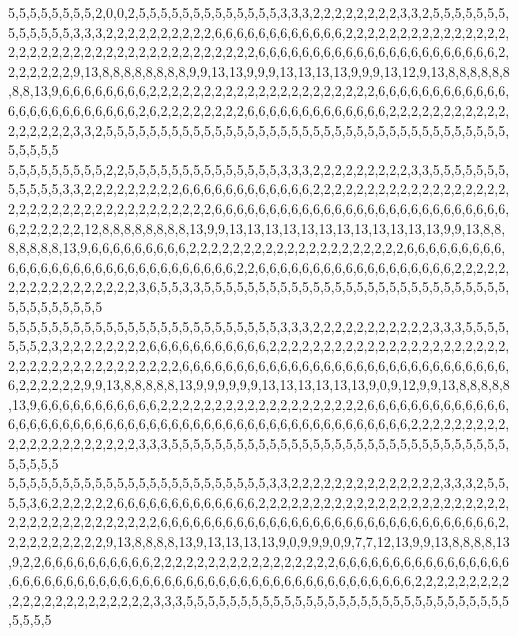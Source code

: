 5,5,5,5,5,5,5,5,2,0,0,2,5,5,5,5,5,5,5,5,5,5,5,5,5,3,3,3,2,2,2,2,2,2,2,2,3,3,2,5,5,5,5,5,5,5,5,5,5,5,5,5,3,3,3,2,2,2,2,2,2,2,2,2,2,6,6,6,6,6,6,6,6,6,6,6,6,2,2,2,2,2,2,2,2,2,2,2,2,2,2,2,2,2,2,2,2,2,2,2,2,2,2,2,2,2,2,2,2,2,2,2,2,2,2,6,6,6,6,6,6,6,6,6,6,6,6,6,6,6,6,6,6,6,6,6,6,2,2,2,2,2,2,2,9,13,8,8,8,8,8,8,8,8,9,9,13,13,9,9,9,13,13,13,13,9,9,9,13,12,9,13,8,8,8,8,8,8,8,8,13,9,6,6,6,6,6,6,6,6,2,2,2,2,2,2,2,2,2,2,2,2,2,2,2,2,2,2,2,2,2,6,6,6,6,6,6,6,6,6,6,6,6,6,6,6,6,6,6,6,6,6,6,6,6,2,6,2,2,2,2,2,2,2,2,6,6,6,6,6,6,6,6,6,6,6,6,6,2,2,2,2,2,2,2,2,2,2,2,2,2,2,2,2,2,3,3,2,5,5,5,5,5,5,5,5,5,5,5,5,5,5,5,5,5,5,5,5,5,5,5,5,5,5,5,5,5,5,5,5,5,5,5,5,5,5,5,5,5,5
5,5,5,5,5,5,5,5,5,2,2,5,5,5,5,5,5,5,5,5,5,5,5,5,5,3,3,3,2,2,2,2,2,2,2,2,2,3,3,5,5,5,5,5,5,5,5,5,5,5,5,3,3,2,2,2,2,2,2,2,2,2,6,6,6,6,6,6,6,6,6,6,6,6,2,2,2,2,2,2,2,2,2,2,2,2,2,2,2,2,2,2,2,2,2,2,2,2,2,2,2,2,2,2,2,2,2,2,2,2,2,6,6,6,6,6,6,6,6,6,6,6,6,6,6,6,6,6,6,6,6,6,6,6,6,6,6,6,6,2,2,2,2,2,2,12,8,8,8,8,8,8,8,8,13,9,9,13,13,13,13,13,13,13,13,13,13,13,13,9,9,13,8,8,8,8,8,8,8,13,9,6,6,6,6,6,6,6,6,6,2,2,2,2,2,2,2,2,2,2,2,2,2,2,2,2,2,2,2,2,6,6,6,6,6,6,6,6,6,6,6,6,6,6,6,6,6,6,6,6,6,6,6,6,6,6,6,6,6,6,2,2,6,6,6,6,6,6,6,6,6,6,6,6,6,6,6,6,6,6,2,2,2,2,2,2,2,2,2,2,2,2,2,2,2,2,2,3,6,5,5,3,3,5,5,5,5,5,5,5,5,5,5,5,5,5,5,5,5,5,5,5,5,5,5,5,5,5,5,5,5,5,5,5,5,5,5,5,5,5
5,5,5,5,5,5,5,5,5,5,5,5,5,5,5,5,5,5,5,5,5,5,5,5,5,3,3,3,2,2,2,2,2,2,2,2,2,2,2,3,3,3,5,5,5,5,5,5,5,2,3,2,2,2,2,2,2,2,2,6,6,6,6,6,6,6,6,6,6,6,2,2,2,2,2,2,2,2,2,2,2,2,2,2,2,2,2,2,2,2,2,2,2,2,2,2,2,2,2,2,2,2,2,2,2,2,2,2,6,6,6,6,6,6,6,6,6,6,6,6,6,6,6,6,6,6,6,6,6,6,6,6,6,6,6,6,6,6,6,2,2,2,2,2,2,9,9,13,8,8,8,8,8,13,9,9,9,9,9,9,13,13,13,13,13,13,9,0,9,12,9,9,13,8,8,8,8,8,13,9,6,6,6,6,6,6,6,6,6,6,6,2,2,2,2,2,2,2,2,2,2,2,2,2,2,2,2,2,2,2,6,6,6,6,6,6,6,6,6,6,6,6,6,6,6,6,6,6,6,6,6,6,6,6,6,6,6,6,6,6,6,6,6,6,6,6,6,6,6,6,6,6,6,6,6,6,6,6,6,6,2,2,2,2,2,2,2,2,2,2,2,2,2,2,2,2,2,2,2,2,2,3,3,3,5,5,5,5,5,5,5,5,5,5,5,5,5,5,5,5,5,5,5,5,5,5,5,5,5,5,5,5,5,5,5,5,5,5,5,5
5,5,5,5,5,5,5,5,5,5,5,5,5,5,5,5,5,5,5,5,5,5,5,5,3,3,2,2,2,2,2,2,2,2,2,2,2,2,2,2,3,3,3,2,5,5,5,5,3,6,2,2,2,2,2,2,6,6,6,6,6,6,6,6,6,6,6,6,6,2,2,2,2,2,2,2,2,2,2,2,2,2,2,2,2,2,2,2,2,2,2,2,2,2,2,2,2,2,2,2,2,2,2,2,2,2,6,6,6,6,6,6,6,6,6,6,6,6,6,6,6,6,6,6,6,6,6,6,6,6,6,6,6,6,6,6,6,2,2,2,2,2,2,2,2,2,2,9,13,8,8,8,8,13,9,13,13,13,13,9,0,9,9,9,0,9,7,7,12,13,9,9,13,8,8,8,8,13,9,2,2,6,6,6,6,6,6,6,6,6,6,2,2,2,2,2,2,2,2,2,2,2,2,2,2,2,2,2,6,6,6,6,6,6,6,6,6,6,6,6,6,6,6,6,6,6,6,6,6,6,6,6,6,6,6,6,6,6,6,6,6,6,6,6,6,6,6,6,6,6,6,6,6,6,6,6,6,6,6,6,6,2,2,2,2,2,2,2,2,2,2,2,2,2,2,2,2,2,2,2,2,2,2,3,3,3,5,5,5,5,5,5,5,5,5,5,5,5,5,5,5,5,5,5,5,5,5,5,5,5,5,5,5,5,5,5,5,5,5,5
